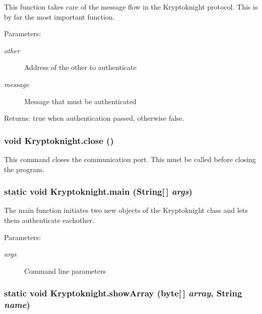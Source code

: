 This function takes care of the message flow in the Kryptoknight protocol. This is by far the most important function. \begin{Desc}
\item[Parameters:]
\begin{description}
\item[{\em other}]Address of the other to authenticate \item[{\em message}]Message that must be authenticated \end{description}
\end{Desc}
\begin{Desc}
\item[Returns:]true when authentication passed, otherwise false. \end{Desc}
\hypertarget{class_kryptoknight_c0}{
\subsubsection[close]{\setlength{\rightskip}{0pt plus 5cm}void Kryptoknight.close ()}}
\label{class_kryptoknight_c0}


This command closes the communication port. This must be called before closing the program. \hypertarget{class_kryptoknight_e0}{
\subsubsection[main]{\setlength{\rightskip}{0pt plus 5cm}static void Kryptoknight.main (String\mbox{[}$\,$\mbox{]} {\em args})}}
\label{class_kryptoknight_e0}


The main function initiates two new objects of the Kryptoknight class and lets them authenticate eachother. \begin{Desc}
\item[Parameters:]
\begin{description}
\item[{\em args}]Command line parameters \end{description}
\end{Desc}
\hypertarget{class_kryptoknight_g0}{
\subsubsection[showArray]{\setlength{\rightskip}{0pt plus 5cm}static void Kryptoknight.show\-Array (byte\mbox{[}$\,$\mbox{]} {\em array}, String {\em name})}}
\label{class_kryptoknight_g0}


